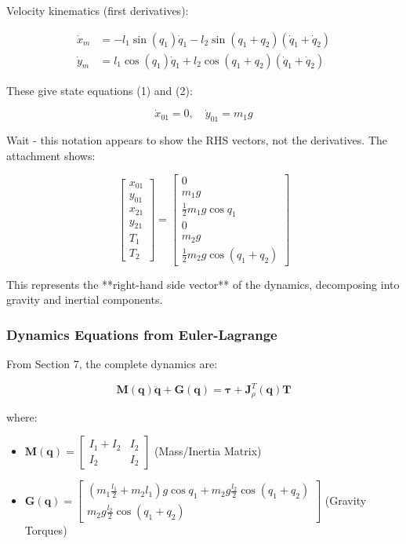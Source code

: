 Velocity kinematics (first derivatives):

\begin{align}
\dot{x}_m &= -l_1 \sin(q_1) \dot{q}_1 - l_2 \sin(q_1+q_2) (\dot{q}_1 + \dot{q}_2) \\
\dot{y}_m &= l_1 \cos(q_1) \dot{q}_1 + l_2 \cos(q_1+q_2) (\dot{q}_1 + \dot{q}_2)
\end{align}

These give state equations (1) and (2):

\begin{equation}
\boxed{\dot{x}_{01} = 0, \quad \dot{y}_{01} = m_1 g}
\end{equation}

Wait - this notation appears to show the RHS vectors, not the derivatives. The attachment shows:

\begin{equation}
[A] \begin{bmatrix} x_{01} \\ y_{01} \\ x_{21} \\ y_{21} \\ T_1 \\ T_2 \end{bmatrix} = \begin{bmatrix} 0 \\ m_1 g \\ \frac{1}{2}m_1 g \cos q_1 \\ 0 \\ m_2 g \\ \frac{1}{2}m_2 g \cos(q_1+q_2) \end{bmatrix}
\end{equation}

This represents the **right-hand side vector** of the dynamics, decomposing into gravity and inertial components.

\subsubsection{Dynamics Equations from Euler-Lagrange}

From Section 7, the complete dynamics are:

\begin{equation}
\mathbf{M}(\mathbf{q}) \ddot{\mathbf{q}} + \mathbf{G}(\mathbf{q}) = \boldsymbol{\tau} + \mathbf{J}_{\rho}^T(\mathbf{q}) \mathbf{T}
\end{equation}

where:
\begin{itemize}
    \item $\mathbf{M}(\mathbf{q}) = \begin{bmatrix} I_1 + I_2 & I_2 \\ I_2 & I_2 \end{bmatrix}$ (Mass/Inertia Matrix)
    \item $\mathbf{G}(\mathbf{q}) = \begin{bmatrix} (m_1 \frac{l_1}{2} + m_2 l_1)g \cos q_1 + m_2 g\frac{l_2}{2}\cos(q_1+q_2) \\ m_2 g\frac{l_2}{2}\cos(q_1+q_2) \end{bmatrix}$ (Gravity Torques)
\end{itemize}

